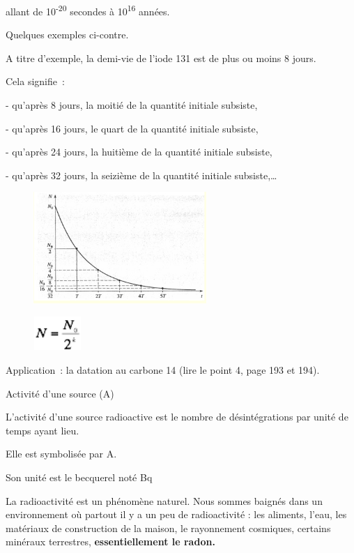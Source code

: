 allant de 10\textsuperscript{-20} secondes à 10\textsuperscript{16
}années.

Quelques exemples ci-contre.

A titre d'exemple, la demi-vie de l'iode 131 est de plus ou moins 8
jours.

Cela signifie~:

- qu'après 8 jours, la moitié de la quantité initiale subsiste,

- qu'après 16 jours, le quart de la quantité initiale subsiste,

- qu'après 24 jours, la huitième de la quantité initiale subsiste,

- qu'après 32 jours, la seizième de la quantité initiale
subsiste,\ldots{}

\begin{figure}
\centering
\includegraphics[width=6.549cm,height=4.221cm]{Pictures/1000000100000179000000F3681E4F513A824012.png}
\caption{}
\end{figure}

\begin{figure}
\centering
\includegraphics[width=1.812cm,height=1.294cm]{Pictures/10000001000000330000002555510415F0E74C8B.png}
\caption{}
\end{figure}

Application~: la datation au carbone 14 (lire le point 4, page 193 et
194).

Activité d'une source (A)

L'activité d'une source radioactive est le nombre de désintégrations par
unité de temps ayant lieu.

Elle est symbolisée par A.

Son unité est le becquerel noté Bq

La radioactivité est un phénomène naturel. Nous sommes baignés dans un
environnement où partout il y a un peu de radioactivité : les aliments,
l'eau, les matériaux de construction de la maison, le rayonnement
cosmiques, certains minéraux terrestres, \textbf{essentiellement le
radon.}

